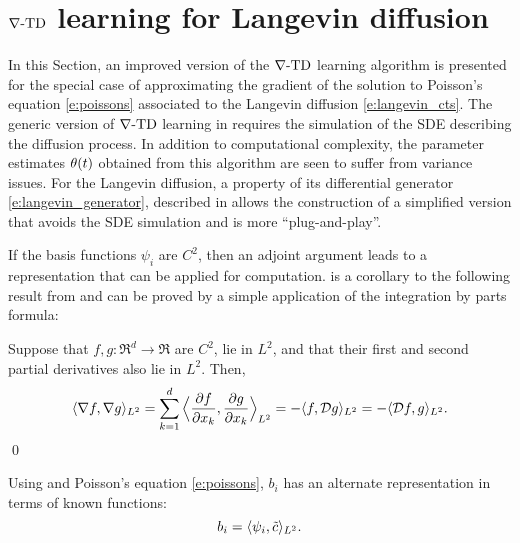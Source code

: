 \section{$\nabla\text{-TD}$ learning for Langevin diffusion}
\label{s:diff_td_langevin}
In this Section, an improved version of the $\nabla\text{-TD}$ learning algorithm is presented for the special case of approximating the gradient of the solution to Poisson's equation \eqref{e:poissons} associated to the Langevin diffusion \eqref{e:langevin_cts}. The generic version of $\nabla\text{-TD}$ learning in  requires the simulation of the SDE describing the diffusion process.  In addition to computational complexity, the parameter estimates $\theta(t)$ obtained from this algorithm are seen to suffer from variance issues. For the Langevin diffusion, a property of its differential generator \eqref{e:langevin_generator},  described in  allows the construction of a simplified version that avoids the SDE simulation and is more ``plug-and-play''. 

If the basis functions $\psi_i$ are $C^2$, then an adjoint argument leads to a representation that can be applied for computation.   is a corollary to the following result from \cite{hwanorwu15,yanlaumehmey16} and can be proved by a simple application of the integration by parts formula:
\begin{proposition}
	\label{prop:lang_generator_grad}
	Suppose that $f,g\colon\Re^d \to\Re$ are $C^2$, lie in $L^2$, and that their first and second partial derivatives also lie in $L^2$. Then,
	\begin{equation}
	\langle \nabla f, \nabla g \rangle_{L^2} = \sum_{k=1}^d \Big \langle \frac{\partial f}{\partial x_k},  \frac{\partial g} {\partial x_k}\Big \rangle_{L^2}  = - \langle  f, \generate g\rangle_{L^2} = - \langle \generate f , g \rangle_{L^2}.
	\label{e:gradDual}
	\end{equation}
	\qed
\end{proposition} 
Using  and Poisson's equation \eqref{e:poissons}, $b_i$ has an alternate representation in terms of known functions:
\begin{equation}
b_i = \langle \psi_i, \tilc \rangle_{L^2}.
\label{e:b_alt}
\end{equation}



